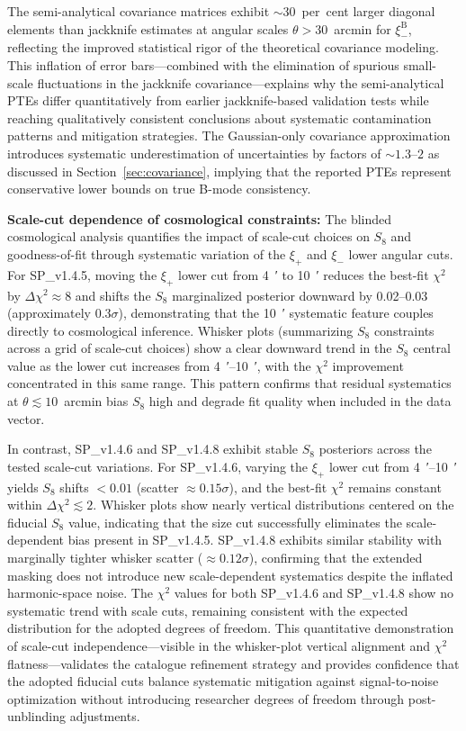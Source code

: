 \documentclass{aa}
\begin{document}
The semi-analytical covariance matrices exhibit $\sim 30$~per~cent larger diagonal elements than jackknife estimates at angular scales $\theta > 30$~arcmin for $\xi_-^{\mathrm{B}}$, reflecting the improved statistical rigor of the theoretical covariance modeling. This inflation of error bars—combined with the elimination of spurious small-scale fluctuations in the jackknife covariance—explains why the semi-analytical PTEs differ quantitatively from earlier jackknife-based validation tests while reaching qualitatively consistent conclusions about systematic contamination patterns and mitigation strategies. The Gaussian-only covariance approximation introduces systematic underestimation of uncertainties by factors of $\sim 1.3$--$2$ as discussed in Section~\ref{sec:covariance}, implying that the reported PTEs represent conservative lower bounds on true B-mode consistency.

\textbf{Scale-cut dependence of cosmological constraints:} The blinded cosmological analysis \citep{goh.etal25} quantifies the impact of scale-cut choices on $S_8$ and goodness-of-fit through systematic variation of the $\xi_+$ and $\xi_-$ lower angular cuts. For SP\_v1.4.5, moving the $\xi_+$ lower cut from \SI{4}{\arcmin} to \SI{10}{\arcmin} reduces the best-fit $\chi^2$ by $\Delta\chi^2 \approx 8$ and shifts the $S_8$ marginalized posterior downward by \num{0.02}--\num{0.03} (approximately \num{0.3}$\sigma$), demonstrating that the \SI{10}{\arcmin} systematic feature couples directly to cosmological inference. Whisker plots (summarizing $S_8$ constraints across a grid of scale-cut choices) show a clear downward trend in the $S_8$ central value as the lower cut increases from \SIrange{4}{10}{\arcmin}, with the $\chi^2$ improvement concentrated in this same range. This pattern confirms that residual systematics at $\theta \lesssim 10$~arcmin bias $S_8$ high and degrade fit quality when included in the data vector.

In contrast, SP\_v1.4.6 and SP\_v1.4.8 exhibit stable $S_8$ posteriors across the tested scale-cut variations. For SP\_v1.4.6, varying the $\xi_+$ lower cut from \SIrange{4}{10}{\arcmin} yields $S_8$ shifts $< 0.01$ (scatter $\approx 0.15\sigma$), and the best-fit $\chi^2$ remains constant within $\Delta\chi^2 \lesssim 2$. Whisker plots show nearly vertical distributions centered on the fiducial $S_8$ value, indicating that the size cut successfully eliminates the scale-dependent bias present in SP\_v1.4.5. SP\_v1.4.8 exhibits similar stability with marginally tighter whisker scatter ($\approx 0.12\sigma$), confirming that the extended masking does not introduce new scale-dependent systematics despite the inflated harmonic-space noise. The $\chi^2$ values for both SP\_v1.4.6 and SP\_v1.4.8 show no systematic trend with scale cuts, remaining consistent with the expected distribution for the adopted degrees of freedom. This quantitative demonstration of scale-cut independence—visible in the whisker-plot vertical alignment and $\chi^2$ flatness—validates the catalogue refinement strategy and provides confidence that the adopted fiducial cuts balance systematic mitigation against signal-to-noise optimization without introducing researcher degrees of freedom through post-unblinding adjustments.
\end{document}
